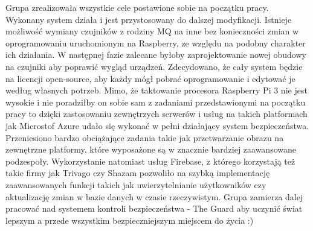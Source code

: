 Grupa zrealizowała wszystkie cele postawione sobie na początku pracy. Wykonany system działa i jest przystosowany do dalszej modyfikacji. Istnieje możliwość wymiany czujników z rodziny MQ na inne bez konieczności zmian w oprogramowaniu uruchomionym na Raspberry, ze względu na podobny charakter ich działania. W następnej fazie zalecane byłoby zaprojektowanie nowej obudowy na czujniki aby poprawić wygląd urządzeń. Zdecydowano, że cały system będzie na licencji open-source, aby każdy mógł pobrać oprogramowanie i edytować je według własnych potrzeb. Mimo, że taktowanie procesora Raspberry Pi 3 nie jest wysokie i nie poradziłby on sobie sam z zadaniami przedstawionymi na początku pracy to dzięki zastosowaniu zewnętrzych serwerów i usług na takich platformach jak Microstof Azure udało się wykonać w pełni działający system bezpieczeństwa. Przeniesiono bardzo obciążające zadania takie jak przetwarzanie obrazu na zewnętrzne platformy, które wyposażone są w znacznie bardziej zaawansowane podzespoły. Wykorzystanie natomiast usług Firebase, z którego korzystają też takie firmy jak Trivago czy Shazam pozwoliło na szybką implementację zaawansowanych funkcji takich jak uwierzytelnianie użytkowników czy aktualizację zmian w bazie danych w czasie rzeczywistym. Grupa zamierza dalej pracować nad systemem kontroli bezpieczeństwa - The Guard aby uczynić świat lepszym a przede wszystkim bezpieczniejszym miejscem do życia :)
